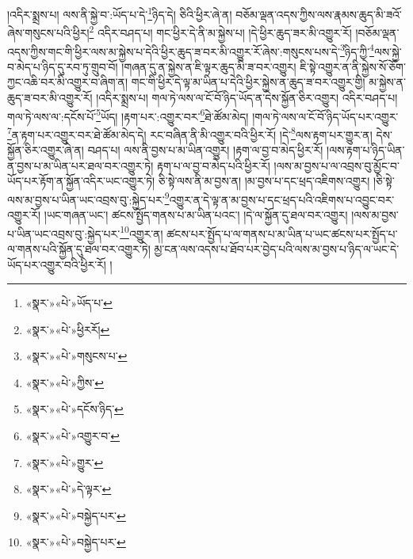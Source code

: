 །འདིར་སྨྲས་པ། ལས་ནི་སྐྱེ་བ་:ཡོད་པ་དེ་\footnote{«སྣར་»«པེ་»ཡོད་པ་}ཉིད་དེ། ཅིའི་ཕྱིར་ཞེ་ན། བཅོམ་ལྡན་འདས་ཀྱིས་ལས་རྣམས་ཆུད་མི་ཟའོ་ཞེས་གསུངས་པའི་ཕྱིར།\footnote{«སྣར་»«པེ་»ཕྱིརརོ།} འདིར་བཤད་པ། གང་ཕྱིར་དེ་ནི་མ་སྐྱེས་པ། །དེ་ཕྱིར་ཆུད་ཟར་མི་འགྱུར་རོ། །བཅོམ་ལྡན་འདས་ཀྱིས་གང་གི་ཕྱིར་ལས་མ་སྐྱེས་པ་དེའི་ཕྱིར་ཆུད་ཟ་བར་མི་འགྱུར་རོ་ཞེས་:གསུངས་པས་དེ་\footnote{«སྣར་»«པེ་»གསུངས་པ་}ཉིད་ཀྱི་\footnote{«སྣར་»«པེ་»ཀྱིས་}ལས་སྐྱེ་བ་མེད་པ་ཉིད་དུ་རབ་ཏུ་གྲུབ་བོ། །གཞན་དུ་ན་སྐྱེས་ན་ཇི་ལྟར་ཆུད་མི་ཟ་བར་འགྱུར། ཇི་སྟེ་འགྱུར་ན་ནི་སྐྱེས་སོ་ཅོག་ཀྱང་འཆི་བར་མི་འགྱུར་བ་ཞིག་ན། གང་གི་ཕྱིར་དེ་ལྟ་མ་ཡིན་པ་དེའི་ཕྱིར་སྐྱེས་ན་ཆུད་ཟ་བར་འགྱུར་གྱི། མ་སྐྱེས་ན་ཆུད་ཟ་བར་མི་འགྱུར་རོ། །འདིར་སྨྲས་པ། གལ་ཏེ་ལས་ལ་ངོ་བོ་ཉིད་ཡོད་ན་དེས་སྐྱོན་ཅིར་འགྱུར། འདིར་བཤད་པ། གལ་ཏེ་ལས་ལ་:དངོས་པོ་\footnote{«སྣར་»«པེ་»དངོས་ཉིད་}ཡོད། །རྟག་པར་:འགྱུར་བར་\footnote{«སྣར་»«པེ་»འགྱུར་བ་}ཐེ་ཚོམ་མེད། །གལ་ཏེ་ལས་ལ་ངོ་བོ་ཉིད་ཡོད་པར་འགྱུར་\footnote{«སྣར་»«པེ་»གྱུར་}ན་རྟག་པར་འགྱུར་བར་ཐེ་ཚོམ་མེད་དེ། རང་བཞིན་ནི་མི་འགྱུར་བའི་ཕྱིར་རོ། །དེ་\footnote{«སྣར་»«པེ་»དེ་ལྟར་}ལས་རྟག་པར་གྱུར་ན། དེས་སྐྱོན་ཅིར་འགྱུར་ཞེ་ན། བཤད་པ། ལས་ནི་བྱས་པ་མ་ཡིན་འགྱུར། །རྟག་ལ་བྱ་བ་མེད་ཕྱིར་རོ། །ལས་རྟག་པ་ཉིད་ཡིན་ན་བྱས་པ་མ་ཡིན་པར་ཐལ་བར་འགྱུར་ཏེ། རྟག་པ་ལ་བྱ་བ་མེད་པའི་ཕྱིར་རོ། །ལས་མ་བྱས་པ་ལ་འབྲས་བུ་མྱོང་བ་ཡོད་པར་རྟོག་ན་སྐྱོན་འདིར་ཡང་འགྱུར་ཏེ། ཅི་སྟེ་ལས་ནི་མ་བྱས་ན། །མ་བྱས་པ་དང་ཕྲད་འཇིགས་འགྱུར། །ཅི་སྟེ་ལས་མ་བྱས་པ་ཡིན་ཡང་འབྲས་བུ་:སྐྱེད་པར་\footnote{«སྣར་»«པེ་»བསྐྱེད་པར་}འགྱུར་ན་དེ་ལྟ་ན་མ་བྱས་པ་དང་ཕྲད་པའི་འཇིགས་པ་འབྱུང་བར་འགྱུར་རོ། །ཡང་གཞན་ཡང་། ཚངས་སྤྱོད་གནས་པ་མ་ཡིན་པའང་། །དེ་ལ་སྐྱོན་དུ་ཐལ་བར་འགྱུར། །ལས་མ་བྱས་པ་ཡིན་ཡང་འབྲས་བུ་:སྐྱེད་པར་\footnote{«སྣར་»«པེ་»བསྐྱེད་པར་}འགྱུར་ན། ཚངས་པར་སྤྱོད་པ་ལ་གནས་པ་མ་ཡིན་པ་ཡང་ཚངས་པར་སྤྱོད་པ་ལ་གནས་པའི་སྐྱོན་དུ་ཐལ་བར་འགྱུར་ཏེ། མྱ་ངན་ལས་འདས་པ་ཐོབ་པར་བྱེད་པའི་ལས་མ་བྱས་པ་ཉིད་ལ་ཡང་དེ་ཡོད་པར་འགྱུར་བའི་ཕྱིར་རོ། །
